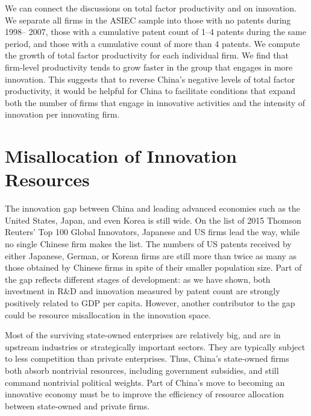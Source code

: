 \documentclass{article}
\begin{document}
    We can connect the discussions on total factor productivity and on innovation. We separate all firms in the ASIEC sample into those with no patents during 1998– 2007, those with a cumulative patent count of 1–4 patents during the same period, and those with a cumulative count of more than 4 patents. We compute the growth of total factor productivity for each individual firm. We find that firm-level productivity tends to grow faster in the group that engages in more innovation. This suggests that to reverse China’s negative levels of total factor productivity, it would be helpful for China to facilitate conditions that expand both the number of firms that engage in innovative activities and the intensity of innovation per innovating firm.
    \section*{Misallocation of Innovation Resources}
    The innovation gap between China and leading advanced economies such as the United States, Japan, and even Korea is still wide. On the list of 2015 Thomson Reuters’ Top 100 Global Innovators, Japanese and US firms lead the way, while no single Chinese firm makes the list. The numbers of US patents received by either Japanese, German, or Korean firms are still more than twice as many as those obtained by Chinese firms in spite of their smaller population size. Part of the gap reflects different stages of development: as we have shown, both investment in R\&D and innovation measured by patent count are strongly positively related to GDP per capita. However, another contributor to the gap could be resource misallocation in the innovation space.

    Most of the surviving state-owned enterprises are relatively big, and are in upstream industries or strategically important sectors. They are typically subject to less competition than private enterprises. Thus, China’s state-owned firms both absorb nontrivial resources, including government subsidies, and still command nontrivial political weights. Part of China’s move to becoming an innovative economy must be to improve the efficiency of resource allocation between state-owned and private firms. 
    
\end{document}
